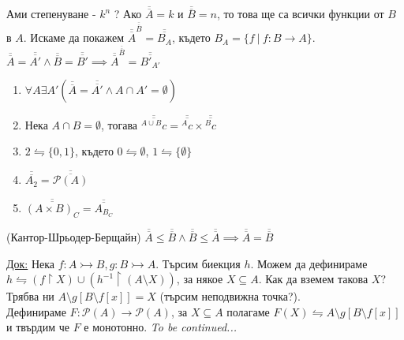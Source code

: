 \documentclass[fleqn, titlepage, 12pt]{report}
\begin{document}
 Ами степенуване - $k^n$ ? Ако $\overline{\overline{A}} = k$ и $\overline{\overline{B}} = n$, то това ще са всички функции от $B$ в $A$.
Искаме да покажем $\overline{\overline{A}}^{\overline{\overline{B}}} = \overline{\overline{B_A}}$,
където $B_A = \{f\ |\ f: B \rightarrow A\}$.
$\overline{\overline{A}} = \overline{\overline{A'}} \land \overline{\overline{B}} = \overline{\overline{B'}} \implies
\overline{\overline{A}}^{\overline{\overline{B}}} = \overline{\overline{{B'}_{A'}}}$\\
\bigbreak

\begin{enumerate}
  \item $\forall{A}\exists{A'}(\overline{\overline{A}} = \overline{\overline{A'}} \land A \cap A' = \emptyset)$
  \item Нека $A \cap B = \emptyset$, тогава $ \overline{\overline{^{A \cup B}c}} = \overline{\overline{^A c}} \times  \overline{\overline{^B c}}$
  \item $2 \leftrightharpoons \{ 0, 1 \}$, където $0 \leftrightharpoons \emptyset$, $1 \leftrightharpoons \{ \emptyset \}$
  \item $\overline{\overline{A_2}} = \overline{\overline{\mathcal{P}(A)}}$
  \item $\overline{\overline{{(A \times B)}_C}} = \overline{\overline{{A}_{B_C}}}$
\end{enumerate}

 (Кантор-Шрьодер-Берщайн)
$\overline{\overline{A}} \leq \overline{\overline{B}} \land \overline{\overline{B}} \leq \overline{\overline{A}} \implies \overline{\overline{A}} = \overline{\overline{B}}$
\bigbreak

\underline{Док:} Нека $f: A \rightarrowtail B, g: B \rightarrowtail A$. Търсим биекция $h$. Можем да дефинираме \\
$h \leftrightharpoons (f \upharpoonright X) \cup (h^{-1} \upharpoonright (A \setminus X))$, за някое $X \subseteq A$.
Как да вземем такова $X$? Трябва ни $A \setminus g[B \setminus f[x]] = X$ (търсим неподвижна точка?).\\
Дефинираме $F: \mathcal{P}(A) \rightarrow \mathcal{P}(A)$, за $X \subseteq A$ полагаме
$F(X) \leftrightharpoons A \setminus g[B \setminus f[x]]$ и твърдим че $F$ е монотонно. \textit{To be continued...}
\end{document}
